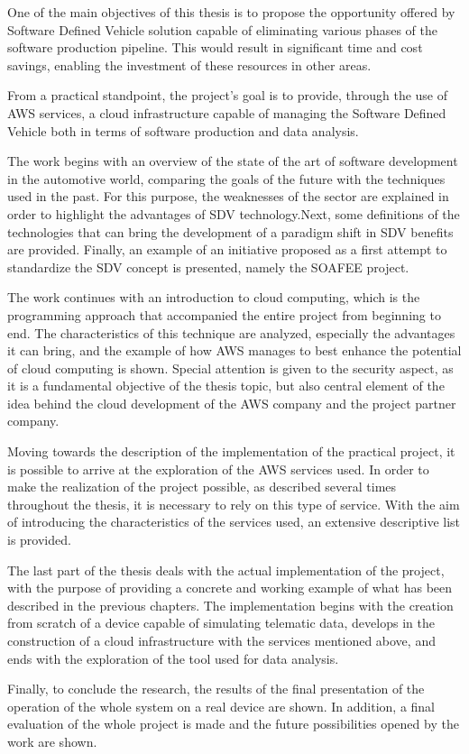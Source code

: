 One of the main objectives of this thesis is to propose the opportunity offered by Software Defined Vehicle solution capable of eliminating various phases of the software production pipeline. This would result in significant time and cost savings, enabling the investment of these resources in other areas.

From a practical standpoint, the project's goal is to provide, through the use of AWS services, a cloud infrastructure capable of managing the Software Defined Vehicle both in terms of software production and data analysis.

The work begins with an overview of the state of the art of software development in the automotive world, comparing the goals of the future with the techniques used in the past. For this purpose, the weaknesses of the sector are explained in order to highlight the advantages of SDV technology.Next, some definitions of the technologies that can bring the development of a paradigm shift in SDV benefits are provided. Finally, an example of an initiative proposed as a first attempt to standardize the SDV concept is presented, namely the SOAFEE project.

The work continues with an introduction to cloud computing, which is the programming approach that accompanied the entire project from beginning to end. The characteristics of this technique are analyzed, especially the advantages it can bring, and the example of how AWS manages to best enhance the potential of cloud computing is shown. Special attention is given to the security aspect, as it is a fundamental objective of the thesis topic, but also central element of the idea behind the cloud development of the AWS company and the project partner company.

Moving towards the description of the implementation of the practical project, it is possible to arrive at the exploration of the AWS services used. In order to make the realization of the project possible, as described several times throughout the thesis, it is necessary to rely on this type of service. With the aim of introducing the characteristics of the services used, an extensive descriptive list is provided.

The last part of the thesis deals with the actual implementation of the project, with the purpose of providing a concrete and working example of what has been described in the previous chapters. The implementation begins with the creation from scratch of a device capable of simulating telematic data, develops in the construction of a cloud infrastructure with the services mentioned above, and ends with the exploration of the tool used for data analysis.

Finally, to conclude the research, the results of the final presentation of the operation of the whole system on a real device are shown. In addition, a final evaluation of the whole project is made and the future possibilities opened by the work are shown.
